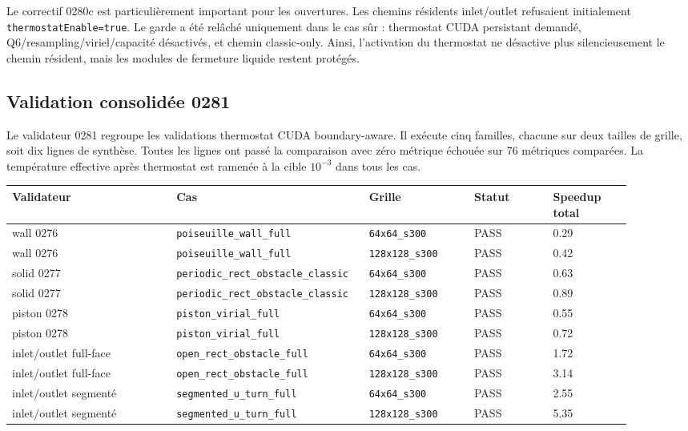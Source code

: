 \documentclass[11pt,a4paper]{article}
\begin{document}
Le correctif 0280c est particulièrement important pour les ouvertures. Les chemins résidents inlet/outlet refusaient initialement \texttt{thermostatEnable=true}. Le garde a été relâché uniquement dans le cas sûr : thermostat CUDA persistant demandé, Q6/resampling/viriel/capacité désactivés, et chemin classic-only. Ainsi, l'activation du thermostat ne désactive plus silencieusement le chemin résident, mais les modules de fermeture liquide restent protégés.

\subsection{Validation consolidée 0281}

Le validateur 0281 regroupe les validations thermostat CUDA boundary-aware. Il exécute cinq familles, chacune sur deux tailles de grille, soit dix lignes de synthèse. Toutes les lignes ont passé la comparaison avec zéro métrique échouée sur 76 métriques comparées. La température effective après thermostat est ramenée à la cible \(10^{-3}\) dans tous les cas.

\begin{center}
\begin{tabular}{p{0.25\linewidth}p{0.25\linewidth}p{0.16\linewidth}p{0.12\linewidth}p{0.12\linewidth}}
\toprule
Validateur & Cas & Grille & Statut & Speedup total \\
\midrule
wall 0276 & \texttt{poiseuille\_wall\_full} & \texttt{64x64\_s300} & PASS & 0.29 \\
wall 0276 & \texttt{poiseuille\_wall\_full} & \texttt{128x128\_s300} & PASS & 0.42 \\
solid 0277 & \texttt{periodic\_rect\_obstacle\_classic} & \texttt{64x64\_s300} & PASS & 0.63 \\
solid 0277 & \texttt{periodic\_rect\_obstacle\_classic} & \texttt{128x128\_s300} & PASS & 0.89 \\
piston 0278 & \texttt{piston\_virial\_full} & \texttt{64x64\_s300} & PASS & 0.55 \\
piston 0278 & \texttt{piston\_virial\_full} & \texttt{128x128\_s300} & PASS & 0.72 \\
inlet/outlet full-face & \texttt{open\_rect\_obstacle\_full} & \texttt{64x64\_s300} & PASS & 1.72 \\
inlet/outlet full-face & \texttt{open\_rect\_obstacle\_full} & \texttt{128x128\_s300} & PASS & 3.14 \\
inlet/outlet segmenté & \texttt{segmented\_u\_turn\_full} & \texttt{64x64\_s300} & PASS & 2.55 \\
inlet/outlet segmenté & \texttt{segmented\_u\_turn\_full} & \texttt{128x128\_s300} & PASS & 5.35 \\
\bottomrule
\end{tabular}
\end{center}
\end{document}
